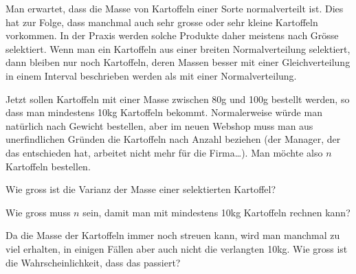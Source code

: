 Man erwartet, dass die Masse von Kartoffeln einer Sorte normalverteilt ist.
Dies hat zur Folge, dass manchmal auch sehr grosse oder sehr kleine 
Kartoffeln vorkommen.
In der Praxis werden solche Produkte daher meistens nach Grösse
selektiert.
Wenn man ein Kartoffeln aus einer breiten Normalverteilung selektiert,
dann bleiben nur noch Kartoffeln, deren Massen besser mit einer
Gleichverteilung in einem Interval beschrieben werden als mit einer
Normalverteilung.

Jetzt sollen Kartoffeln mit einer Masse zwischen 80g und 100g bestellt
werden, so dass man mindestens 10kg Kartoffeln bekommt.
Normalerweise würde man natürlich nach Gewicht bestellen, aber im neuen
Webshop muss man aus unerfindlichen Gründen die Kartoffeln
nach Anzahl beziehen
(der Manager, der das entschieden hat, arbeitet nicht mehr für die Firma\dots).
Man möchte also $n$ Kartoffeln bestellen.

\begin{teilaufgaben}
\item
Wie gross ist die Varianz der Masse einer selektierten Kartoffel?
\item
Wie gross muss $n$ sein, damit man mit mindestens 10kg Kartoffeln rechnen kann?
\item
Da die Masse der Kartoffeln immer noch streuen kann, wird
man manchmal zu viel erhalten, 
in einigen Fällen aber auch nicht die verlangten 10kg.
Wie gross ist die Wahrscheinlichkeit, dass das passiert?
\end{teilaufgaben}


